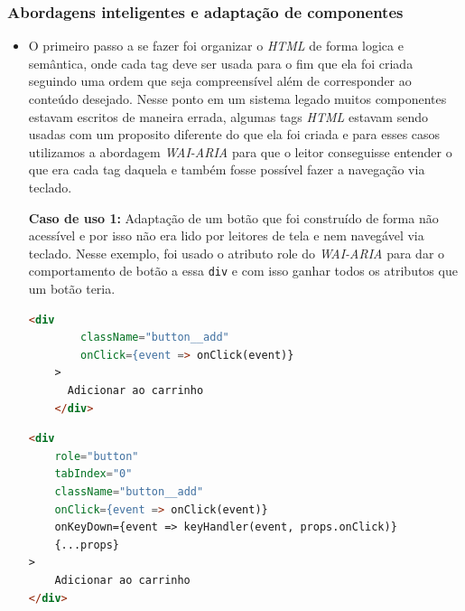 \subsubsection{Abordagens inteligentes e adaptação de componentes}
{\begin{itemize}
    \item O primeiro passo a se fazer foi organizar o \textit{HTML} \cite{HTML} de forma logica e semântica, onde cada tag deve ser usada para o fim que ela foi criada seguindo uma ordem que seja compreensível além de corresponder ao conteúdo desejado. Nesse ponto em um sistema legado muitos componentes estavam escritos de maneira errada, algumas tags \textit{HTML} \cite{HTML} estavam sendo usadas com um proposito diferente do que ela foi criada e para esses casos utilizamos a abordagem \textit{WAI-ARIA} \cite{WAI-ARIA} para que o leitor conseguisse entender o que era cada tag daquela e também fosse possível fazer a navegação via teclado.

\newpage

{\textbf{Caso de uso 1:} Adaptação de um botão que foi construído de forma não acessível e por isso não era lido por leitores de tela e nem navegável via teclado. Nesse exemplo, foi usado o atributo role do \textit{WAI-ARIA}\cite{WAI-ARIA} para dar o comportamento de botão a essa \lstinline{div} e com isso ganhar todos os atributos que um botão teria.

\begin{lstlisting}[language=html, caption=Componente de botão antes de receber boas praticas e acessibilidade]
    <div
        className="button__add"
        onClick={event => onClick(event)}
    >
      Adicionar ao carrinho 
    </div>
\end{lstlisting}}
{\begin{lstlisting}[language=html,caption=Adaptação do componente de botão usando \textit{WAI-ARIA}]
<div 
    role="button" 
    tabIndex="0" 
    className="button__add"
    onClick={event => onClick(event)}
    onKeyDown={event => keyHandler(event, props.onClick)}
    {...props}
>
    Adicionar ao carrinho
</div>
 
\end{lstlisting}}


\end{itemize}}
